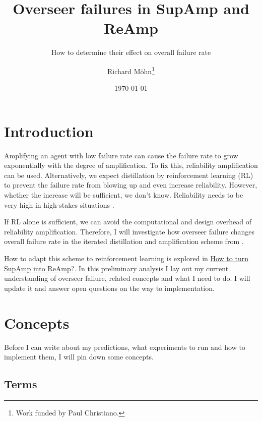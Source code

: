 \documentclass{farlamp}
\title{Overseer failures in SupAmp and ReAmp}
\subtitle{How to determine their effect on overall failure rate}
\author{Richard Möhn\thanks{Work funded by Paul Christiano.}}
\date{\today}
\begin{document}
\maketitle
\tableofcontents

\section{Introduction}

Amplifying an agent with low failure rate can cause the failure rate to grow
exponentially with the degree of amplification. To fix this, reliability
amplification can be used. Alternatively, we expect distillation by
reinforcement learning (RL) to prevent the failure rate from blowing up and even
increase reliability.
However, whether the increase will be sufficient, we don't know.
\parencite{ChriRelAmp} Reliability needs to be very high in high-stakes
situations \parencite[see][]{ChriLearnCata}.

If RL alone is sufficient, we can avoid the computational and design overhead of
reliability amplification. Therefore, I will investigate how overseer failure
changes overall failure rate in the iterated distillation and amplification
scheme from \textcite{CSASupAmp}.

How to adapt this scheme to reinforcement learning is explored in
\href{https://github.com/rmoehn/farlamp/raw/master/supamp-reamp.pdf}{How to turn
SupAmp into ReAmp?}. In this preliminary analysis I lay out my current
understanding of overseer failure, related concepts and what I need to do. I
will update it and answer open questions on the way to implementation.


\section{Concepts}

Before I can write about my predictions, what experiments to run and how to
implement them, I will pin down some concepts.


\subsection{Terms}
\end{document}
